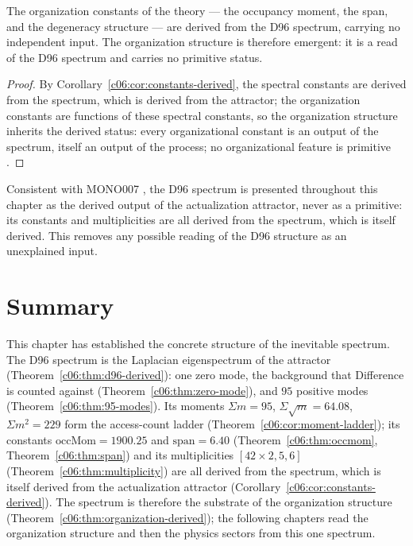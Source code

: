\begin{theorem}
\label{c06:thm:organization-derived}
The organization constants of the theory --- the occupancy moment, the span, and the
degeneracy structure --- are derived from the D96 spectrum, carrying no independent input.
The organization structure is therefore emergent: it is a read of the D96 spectrum and
carries no primitive status.
\end{theorem}

\begin{proof}
By Corollary~\ref{c06:cor:constants-derived}, the spectral constants are derived from the
spectrum, which is derived from the attractor; the organization constants are functions of
these spectral constants, so the organization structure inherits the derived status: every
organizational constant is an output of the spectrum, itself an output of the process; no
organizational feature is primitive \cite{c06:QG295}.
\end{proof}

Consistent with MONO007 \cite{c06:MONO007}, the D96 spectrum is presented throughout this
chapter as the derived output of the actualization attractor, never as a primitive: its
constants and multiplicities are all derived from the spectrum, which is itself derived.
This removes any possible reading of the D96 structure as an unexplained input.

\section{Summary}
\label{c06:sec:d96-summary}

This chapter has established the concrete structure of the inevitable spectrum. The D96
spectrum is the Laplacian eigenspectrum of the attractor (Theorem~\ref{c06:thm:d96-derived}):
one zero mode, the background that Difference is counted against
(Theorem~\ref{c06:thm:zero-mode}), and $95$ positive modes (Theorem~\ref{c06:thm:95-modes}).
Its moments $\Sigma m=95$, $\Sigma\sqrt{m}=64.08$, $\Sigma m^2=229$ form the access-count
ladder (Theorem~\ref{c06:cor:moment-ladder}); its constants $\mathrm{occMom}=1900.25$ and
$\mathrm{span}=6.40$ (Theorem~\ref{c06:thm:occmom}, Theorem~\ref{c06:thm:span}) and its
multiplicities $[42\times2,5,6]$ (Theorem~\ref{c06:thm:multiplicity}) are all derived from
the spectrum, which is itself derived from the actualization attractor
(Corollary~\ref{c06:cor:constants-derived}). The spectrum is therefore the substrate of the
organization structure (Theorem~\ref{c06:thm:organization-derived}); the following chapters
read the organization structure and then the physics sectors from this one spectrum.

